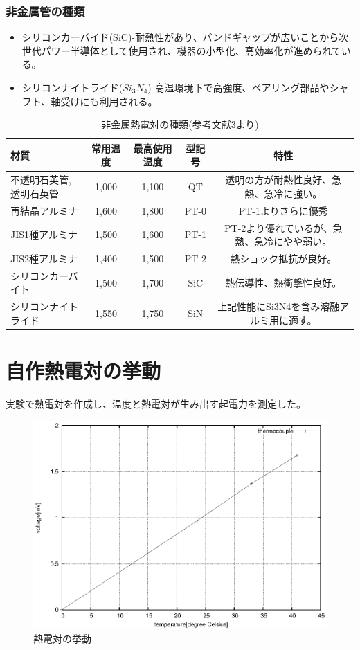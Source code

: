 \documentclass[a4j,twoside,openright,11pt]{jarticle}
\begin{document}
\subsubsection{非金属管の種類}
\begin{itemize}
\item シリコンカーバイド(SiC)-耐熱性があり、バンドギャップが広いことから次世代パワー半導体として使用され、機器の小型化、高効率化が進められている。
\item シリコンナイトライド($Si_3N_4$)-高温環境下で高強度、ベアリング部品やシャフト、軸受けにも利用される。
\end{itemize}
\begin{table}[htbp]
\begin{center}
\small
  \caption{非金属熱電対の種類(参考文献3より)}
  \begin{tabular}{l|c|c|c|c}
\hline
材質&常用温度&最高使用温度&型記号&特性\\
\hline
\hline
不透明石英管,透明石英管&1,000&1,100&QT&透明の方が耐熱性良好、急熱、急冷に強い。\\
再結晶アルミナ&1,600&1,800&PT-0&PT-1よりさらに優秀\\
JIS1種アルミナ&1,500&1,600&PT-1&PT-2より優れているが、急熱、急冷にやや弱い。\\
JIS2種アルミナ&1,400&1,500&PT-2&熱ショック抵抗が良好。\\
シリコンカーバイト&1,500&1,700&SiC&熱伝導性、熱衝撃性良好。\\
シリコンナイトライド&1,550&1,750&SiN&上記性能にSi3N4を含み溶融アルミ用に適す。\\
\hline
  \end{tabular}
\normalsize
\end{center}
\end{table}
\section{自作熱電対の挙動}
実験で熱電対を作成し、温度と熱電対が生み出す起電力を測定した。
\begin{figure}[htbp]
\begin{center}
\includegraphics[width=12cm]{./netudentui/data.eps}
\end{center}
\caption{熱電対の挙動}
\end{figure}
\end{document}
